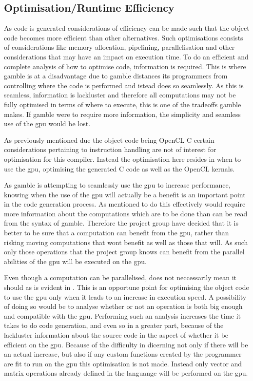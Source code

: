 \subsection*{Optimisation/Runtime Efficiency}
As code is generated considerations of efficiency can be made such that the object code becomes more efficient than other alternatives.
Such optimisations consists of considerations like memory allocation, pipelining, parallelisation and other considerations that may have an impact on execution time.
To do an efficient and complete analysis of how to optimise code, information is required.
This is where \gls{gamble} is at a disadvantage due to \gls{gamble} distances its programmers from controlling where the code is performed and istead does so seamlessly.
As this is seamless, information is lackluster and therefore all computations may not be fully optimised in terms of where to execute, this is one of the tradeoffs \gls{gamble} makes.
If \gls{gamble} were to require more information, the simplicity and seamless use of the \acrshort{gpu} would be lost.

As previously mentioned due the object code being OpenCL C certain considerations pertaining to instruction handling are not of interest for optimisation for this compiler.
Instead the optimisation here resides in when to use the \acrshort{gpu}, optimising the generated C code as well as the OpenCL kernals.

As \gls{gamble} is attempting to seamlessly use the \acrshort{gpu} to increase performance, knowing when the use of the \acrshort{gpu} will actually be a benefit is an important point in the code generation process.
As mentioned to do this effectively would require more information about the computations which are to be done than can be read from the syntax of \gls{gamble}.
Therefore the project group have decided that it is better to be sure that a computation can benefit from the \acrshort{gpu}, rather than risking moving computations that wont benefit as well as those that will.
As such only those operations that the project group knows can benefit from the parallel abilities of the \acrshort{gpu} will be executed on the \acrshort{gpu}.

Even though a computation can be parallelised, does not neccessarily mean it should as is evident in .
This is an opportune point for optimising the object code to use the \acrshort{gpu} only when it leads to an increase in execution speed.
A possibility of doing so would be to analyse whether or not an operation is both big enough and compatible with the \acrshort{gpu}.
Performing such an analysis increases the time it takes to do code generation, and even so in a greater part, because of the lackluster information about the source code in the aspect of whether it be efficient on the \acrshort{gpu}.
Because of the difficulty in dicerning not only if there will be an actual increase, but also if any custom functions created by the programmer are fit to run on the \acrshort{gpu} this optimisation is not made.
Instead only vector and matrix operations already defined in the languange will be performed on the \acrshort{gpu}.

